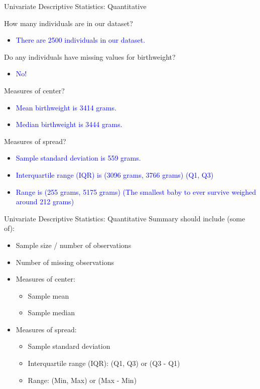 \documentclass[10pt,t]{beamer}
\begin{document}
\begin{frame}{Univariate Descriptive Statistics: Quantitative}

How many individuals are in our dataset?

\begin{itemize}
	\item[] \textcolor{blue}{There are 2500 individuals in our dataset.}
\end{itemize}

Do any individuals have missing values for birthweight?

\begin{itemize}
	\item[] \textcolor{blue}{No!}
\end{itemize}

Measures of center?

\begin{itemize}
	\item[] \textcolor{blue}{Mean birthweight is 3414 grams.}
	\item[] \textcolor{blue}{Median birthweight is 3444 grams.}
\end{itemize}

Measures of spread?

\begin{itemize}
	\item[] \textcolor{blue}{Sample standard deviation is 559 grams.}
	\item[] \textcolor{blue}{Interquartile range (IQR) is (3096 grams, 3766 grams) (Q1, Q3)}
	\item[] \textcolor{blue}{Range is (255 grams, 5175 grams) (The smallest baby to ever survive weighed around 212 grams)}
\end{itemize}


\end{frame}
	
\begin{frame}{Univariate Descriptive Statistics: Quantitative}
Summary should include (some of):

\vspace{0.3cm}

\begin{itemize}
	\item Sample size / number of observations
	\item Number of missing observations
	\item Measures of center:
	\begin{itemize}
		\item Sample mean
		\item Sample median
	\end{itemize}
	\item Measures of spread:
	\begin{itemize}
		\item Sample standard deviation
		\item Interquartile range (IQR): (Q1, Q3) or (Q3 - Q1)
		\item Range: (Min, Max) or (Max - Min)
	\end{itemize}
\end{itemize}

\end{frame}
\end{document}
